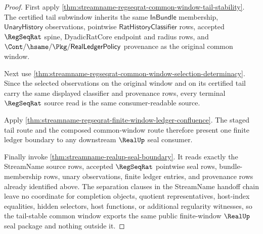 \begin{proof}
First apply
\autoref{thm:streamname-regseqrat-common-window-tail-stability}. The certified
tail subwindow inherits the same $\mathsf{InBundle}$ membership,
$\mathsf{UnaryHistory}$ observations, pointwise
$\mathsf{RatHistoryClassifier}$ rows, accepted $\RegSeqRat$ spine,
DyadicRatCore endpoint and radius rows, and
$\Cont/\hsame/\Pkg/\mathsf{RealLedgerPolicy}$ provenance as the original
common window.

Next use
\autoref{thm:streamname-regseqrat-common-window-selection-determinacy}. Since
the selected observations on the original window and on its certified tail
carry the same displayed classifier and provenance rows, every terminal
$\RegSeqRat$ source read is the same consumer-readable source.

Apply
\autoref{thm:streamname-regseqrat-finite-window-ledger-confluence}. The staged
tail route and the composed common-window route therefore present one finite
ledger boundary to any downstream $\RealUp$ seal consumer.

Finally invoke \autoref{thm:streamname-realup-seal-boundary}. It reads exactly
the StreamName source rows, accepted $\RegSeqRat$ pointwise seal rows,
bundle-membership rows, unary observations, finite ledger entries, and
provenance rows already identified above. The separation clauses in the
StreamName handoff chain leave no coordinate for completion objects, quotient
representatives, host-index equalities, hidden selectors, host functions, or
additional regularity witnesses, so the tail-stable common window exports the
same public finite-window $\RealUp$ seal package and nothing outside it.
\end{proof}

